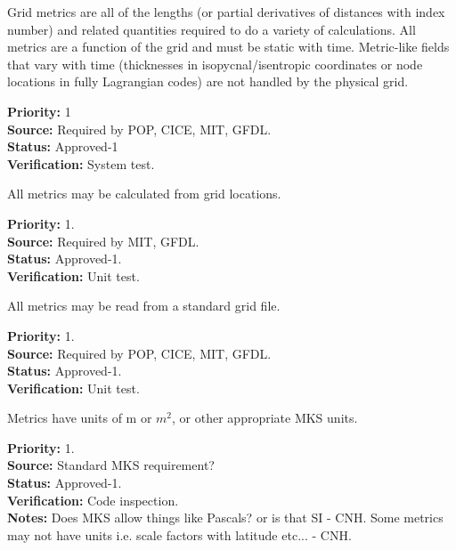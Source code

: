 Grid metrics are all of the lengths (or partial derivatives of distances with
index number) and related quantities required to do a variety of calculations. 
All metrics are a function of the grid and must be static with time.  Metric-like
fields that vary with time (thicknesses in isopycnal/isentropic coordinates
or node locations in fully Lagrangian codes) are not handled by the physical grid.
\begin{reqlist}
{\bf Priority:} 1 \\
{\bf Source:} Required by POP, CICE, MIT, GFDL. \\
{\bf Status:} Approved-1 \\
{\bf Verification:} System test.
\end{reqlist}

All metrics may be calculated from grid locations.
\begin{reqlist}
{\bf Priority:} 1. \\
{\bf Source:} Required by MIT, GFDL.\\
{\bf Status:} Approved-1. \\
{\bf Verification:} Unit test.
\end{reqlist}

All metrics may be read from a standard grid file.
\begin{reqlist}
{\bf Priority:} 1. \\
{\bf Source:} Required by POP, CICE, MIT, GFDL. \\
{\bf Status:} Approved-1. \\
{\bf Verification:} Unit test. 
\end{reqlist}

Metrics have units of m or $m^2$, or other appropriate MKS units.
\begin{reqlist}
{\bf Priority:} 1. \\
{\bf Source:} Standard MKS requirement? \\
{\bf Status:} Approved-1. \\
{\bf Verification:} Code inspection. \\
{\bf Notes:} Does MKS allow things like Pascals? or is that SI - CNH.
Some metrics may not have units i.e. scale factors with latitude etc... - CNH.
\end{reqlist}

